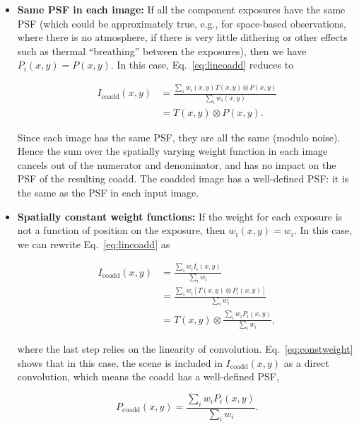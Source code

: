\documentclass{openjournal}
\begin{document}
\begin{itemize}
    \item \textbf{Same PSF in each image:} If all the component exposures have the same PSF (which could be approximately true, e.g., for space-based observations, where there is no atmosphere, if there is very little dithering or other effects such as thermal ``breathing'' between the exposures), then we have $P_i(x,y)=P(x,y)$.  In this case, Eq.~\eqref{eq:lincoadd} reduces to
    \begin{linenomath}\begin{align*}
         I_\text{coadd}(x,y) &= \frac{\sum_i w_i(x,y) T(x,y)\otimes P(x,y)}{\sum_i w_i(x,y)} \\
         &= T(x,y)\otimes P(x,y).
    \end{align*}\end{linenomath}
    Since each image has the same PSF, they are all the same (modulo noise).  Hence the sum over the spatially varying weight function in each image cancels out of the numerator and denominator, and has no impact on the PSF of the resulting coadd.  The coadded image has a well-defined PSF: it is the same as the PSF in each input image.
    
    \item \textbf{Spatially constant weight functions:}  If the weight for each exposure is not a function of position on the exposure, then  $w_i(x,y)=w_i$.  In this case, we can rewrite Eq.~\eqref{eq:lincoadd} as
    \begin{linenomath}\begin{align}
        I_\text{coadd}(x,y) &= \frac{\sum_i w_i I_i(x,y)}{\sum_i w_i} \nonumber\\
        &= \frac{\sum_i w_i \left[T(x,y) \otimes P_i(x,y)\right]}{\sum_i w_i} \nonumber \\
        &= T(x,y) \otimes \frac{\sum_i w_i P_i(x,y)}{\sum_i w_i},\label{eq:constweight}
    \end{align}\end{linenomath}
    where the last step relies on the linearity of convolution.  
    Eq.~\eqref{eq:constweight} shows that in this case, the scene is included in $I_\text{coadd}(x,y)$ as a direct convolution, which means the coadd has a well-defined PSF, 
    \begin{linenomath}\begin{equation}\label{eq:constweightpsf}
        P_\text{coadd}(x,y) = \frac{\sum_i w_i P_i(x,y)}{\sum_i w_i}.
    \end{equation}\end{linenomath}


\end{itemize}
\end{document}
